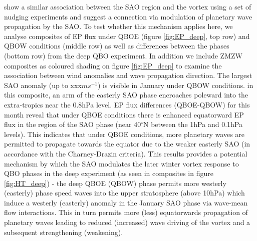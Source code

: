 \cite{gray2020} show a similar association between the SAO region and the vortex using a set of nudging experiments and suggest a connection via modulation of planetary wave propagation by the SAO. To test whether this mechanism applies here, we analyse composites of EP flux under QBOE (figure \ref{fig:EP_deep}, top row) and QBOW conditions (middle row) as well as differences between the phases (bottom row) from the deep QBO experiment. In addition we include ZMZW composites as coloured shading on figure \ref{fig:EP_deep} to examine the association between wind anomalies and wave propagation direction. The largest SAO anomaly (up to xxx$ms^{-1}$) is visible in January under QBOW conditions. in this composite, an arm of the easterly SAO phase encroaches poleward into the extra-tropics near the 0.8hPa level. EP flux differences (QBOE-QBOW) for this month reveal that under QBOE conditions there is enhanced equatorward EP flux in the region of the SAO phase (near 40$^\circ$N between the 1hPa and 0.1hPa levels). This indicates that under QBOE conditions, more planetary waves are permitted to propagate towards the equator due to the weaker easterly SAO (in accordance with the Charney-Drazin criteria). This results provides a potential mechanism by which the SAO modulates the later winter vortex response to QBO phases in the deep experiment (as seen in composites in figure \ref{fig:HT_deep}) - the deep QBOE (QBOW) phase permits more westerly (easterly) phase speed waves into the upper stratosphere (above 10hPa) which induce a westerly (easterly) anomaly in the January SAO phase via wave-mean flow interactions. This in turn permits more (less) equatorwards propagation of planetary waves leading to reduced (increased) wave driving of the vortex and a subsequent strengthening (weakening). 

